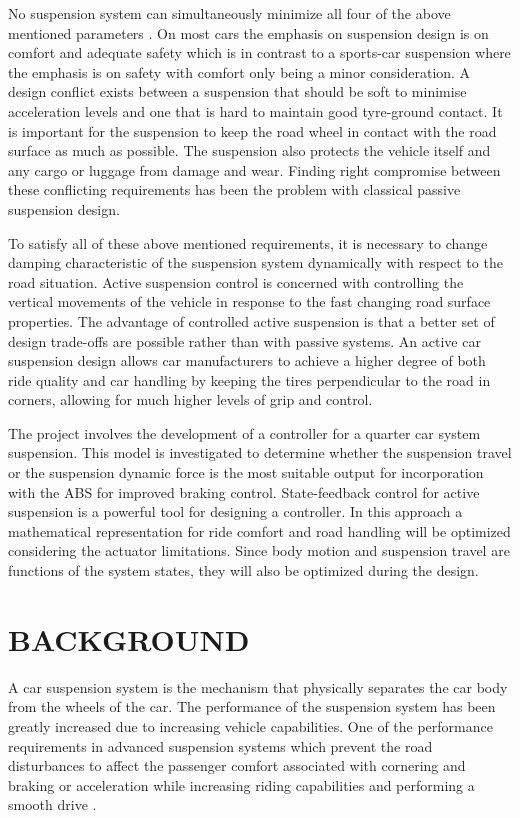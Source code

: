 \documentclass[10pt,twocolumn]{witseiepaper}
\begin{document}
No suspension system can simultaneously minimize all four of the above mentioned parameters \cite{Taghirad:1995}. On most cars the emphasis on suspension design is on comfort and adequate safety which is in contrast to a sports-car suspension where the emphasis is on safety with comfort only being a minor consideration. A design conflict exists between a suspension that should be soft to minimise acceleration levels and one that is hard to maintain good tyre-ground contact. It is important for the suspension to keep the road wheel in contact with the road surface as much as possible. The suspension also protects the vehicle itself and any cargo or luggage from damage and wear. Finding right compromise between these conflicting requirements has been the problem with classical passive suspension design.

To satisfy all of these above mentioned requirements, it is necessary to change damping characteristic of the suspension system dynamically with respect to the road situation. Active suspension control is concerned with controlling the vertical movements of the vehicle in response to the fast changing road surface properties. The advantage of controlled active suspension is that a better set of design trade-offs are possible rather than with passive systems. An active car suspension design allows car manufacturers to achieve a higher degree of both ride quality and car handling by keeping the tires perpendicular to the road in corners, allowing for much higher levels of grip and control.

The project involves the development of a controller for a quarter car system suspension. This model is investigated to determine whether the suspension travel or the suspension dynamic force is the most suitable output for incorporation with the ABS for improved braking control. State-feedback control for active suspension is a powerful tool for designing a controller. In this approach a mathematical representation for ride comfort and road handling will be optimized considering the actuator limitations. Since body motion and suspension travel are functions of the system states, they will also be optimized during the design.

\section{BACKGROUND}

A car suspension system is the mechanism that physically separates the car body from the wheels of the car. The performance of the suspension system has been greatly increased due to increasing vehicle capabilities. One of the performance requirements in advanced suspension systems which prevent the road disturbances to affect the passenger comfort associated with cornering and braking or acceleration while increasing riding capabilities and performing a smooth drive \cite{Ghita:2008}. 
\end{document}
